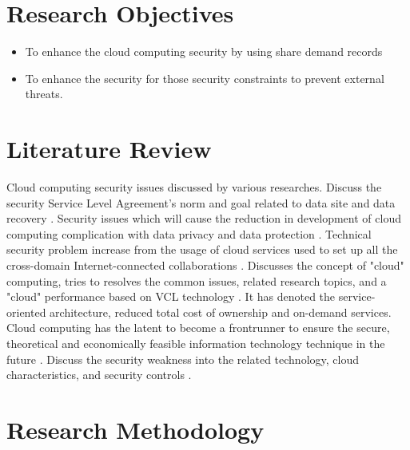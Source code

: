 \documentclass[a4paper, 12pt]{article}
\begin{document}
\section{Research Objectives}

\begin{itemize}
\item To enhance the cloud computing security by using share demand records
\item To enhance the security for those security constraints to prevent external threats.
\end{itemize}

\section{Literature Review}

Cloud computing security issues discussed by various researches. Discuss the security Service Level Agreement's norm and goal related to data site and data recovery \cite{kandukuri2009cloud}. Security issues which will cause the reduction in development of cloud computing complication with data privacy and data protection  \cite{subashini2011survey}. Technical security problem increase from the usage of cloud services used to set up all the cross-domain Internet-connected collaborations \cite{jensen2009technical}. Discusses the concept of "cloud" computing, tries to resolves the common issues, related research topics, and a "cloud" performance based on VCL technology \cite{a2008cloud}. It has denoted the service-oriented architecture, reduced total cost of ownership and on-demand services. Cloud computing has the latent to become a frontrunner to ensure the secure, theoretical and economically feasible information technology technique in the future \cite{so2011cloud}. Discuss the security weakness into the related technology, cloud characteristics, and security controls \cite{grobauer2011understanding}.

\section{Research Methodology}
\end{document}
